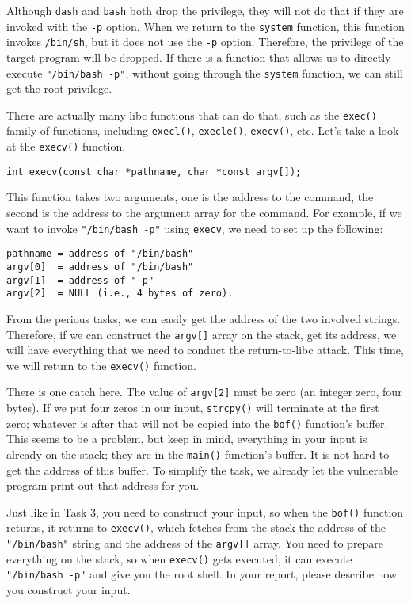 Although \texttt{dash} and \texttt{bash} both drop the \setuid privilege,
they will not do that if they are invoked with the \texttt{-p} option. When
we return to the \texttt{system} function, this function invokes \texttt{/bin/sh}, 
but it does not use the \texttt{-p} option. Therefore, the \setuid
privilege of the target program will be dropped. If there is a function
that allows us to directly execute \texttt{"/bin/bash -p"}, without going
through the \texttt{system} function, we can still get the root privilege. 

There are actually many libc functions that can do that, such as 
the \texttt{exec()} family  of functions, including \texttt{execl()},
\texttt{execle()}, \texttt{execv()}, etc. Let's take a look at the
\texttt{execv()} function.

\begin{lstlisting}
int execv(const char *pathname, char *const argv[]);
\end{lstlisting}
 
This function takes two arguments, one is the address to the command, the 
second is the address to the argument array for the command. For example, if we 
want to invoke \texttt{"/bin/bash -p"} using \texttt{execv}, we need to 
set up the following:

\begin{lstlisting}
pathname = address of "/bin/bash" 
argv[0]  = address of "/bin/bash"
argv[1]  = address of "-p"
argv[2]  = NULL (i.e., 4 bytes of zero).
\end{lstlisting}
 
From the perious tasks, we can easily get the address of the two involved 
strings. Therefore, if we can construct the \texttt{argv[]} array on the stack, 
get its address, we will have everything that we need to conduct the 
return-to-libc attack. This time, we will return to the \texttt{execv()} function. 

There is one catch here. The value of \texttt{argv[2]} must be zero (an integer zero, 
four bytes). If we put four zeros in our input, \texttt{strcpy()} will terminate
at the first zero; whatever is after that will not be copied into 
the \texttt{bof()} function's buffer. This seems to be a problem, but keep
in mind, everything in your input is already on the stack; they are in
the \texttt{main()} function's buffer. It is not hard to get the 
address of this buffer. To simplify the task, we already let the 
vulnerable program print out that address for you. 

Just like in Task 3, you need to construct your input, so when the \texttt{bof()}
function returns, it returns to \texttt{execv()}, which fetches from the stack
the address of the \texttt{"/bin/bash"} string and the address of the \texttt{argv[]} 
array. You need to prepare everything on the stack, so when \texttt{execv()}
gets executed, it can execute \texttt{"/bin/bash -p"} and give you the root shell. 
In your report, please describe how you construct your input. 



